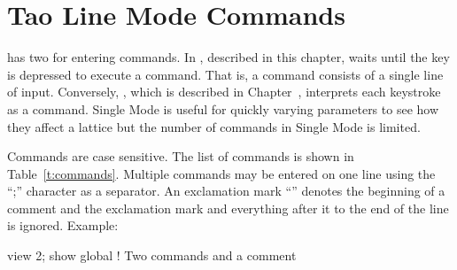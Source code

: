 \chapter{Tao Line Mode Commands}
\label{c:command}

\tao has two  for entering commands. In ,
described in this chapter, \tao waits until the  key is
depressed to execute a command. That is, a command consists of a
single line of input. Conversely, , which is described
in Chapter~, interprets each keystroke as a
command. Single Mode is useful for quickly varying parameters to see
how they affect a lattice but the number of commands in Single Mode is
limited.

Commands are case sensitive. The list of commands is shown in
Table~\ref{t:commands}. Multiple commands
may be entered on one line using the ``;'' character as a separator.
An exclamation mark ``\vn{!}'' denotes the beginning of a comment and the
exclamation mark and everything after it to the end of the line is ignored.
Example:
\begin{example}
  view 2; show global  ! Two commands and a comment
\end{example}


